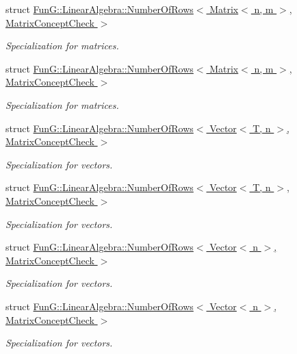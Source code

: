 \begin{DoxyCompactItemize}
struct \hyperlink{structFunG_1_1LinearAlgebra_1_1NumberOfRows_3_01Matrix_3_01n_00_01m_01_4_00_01MatrixConceptCheck_01_4}{Fun\+G\+::\+Linear\+Algebra\+::\+Number\+Of\+Rows$<$ Matrix$<$ n, m $>$, Matrix\+Concept\+Check $>$}
\begin{DoxyCompactList}\small\item\em Specialization for matrices. \end{DoxyCompactList}\item 
struct \hyperlink{structFunG_1_1LinearAlgebra_1_1NumberOfRows_3_01Matrix_3_01n_00_01m_01_4_00_01MatrixConceptCheck_01_4}{Fun\+G\+::\+Linear\+Algebra\+::\+Number\+Of\+Rows$<$ Matrix$<$ n, m $>$, Matrix\+Concept\+Check $>$}
\begin{DoxyCompactList}\small\item\em Specialization for matrices. \end{DoxyCompactList}\item 
struct \hyperlink{structFunG_1_1LinearAlgebra_1_1NumberOfRows_3_01Vector_3_01T_00_01n_01_4_00_01MatrixConceptCheck_01_4}{Fun\+G\+::\+Linear\+Algebra\+::\+Number\+Of\+Rows$<$ Vector$<$ T, n $>$, Matrix\+Concept\+Check $>$}
\begin{DoxyCompactList}\small\item\em Specialization for vectors. \end{DoxyCompactList}\item 
struct \hyperlink{structFunG_1_1LinearAlgebra_1_1NumberOfRows_3_01Vector_3_01T_00_01n_01_4_00_01MatrixConceptCheck_01_4}{Fun\+G\+::\+Linear\+Algebra\+::\+Number\+Of\+Rows$<$ Vector$<$ T, n $>$, Matrix\+Concept\+Check $>$}
\begin{DoxyCompactList}\small\item\em Specialization for vectors. \end{DoxyCompactList}\item 
struct \hyperlink{structFunG_1_1LinearAlgebra_1_1NumberOfRows_3_01Vector_3_01n_01_4_00_01MatrixConceptCheck_01_4}{Fun\+G\+::\+Linear\+Algebra\+::\+Number\+Of\+Rows$<$ Vector$<$ n $>$, Matrix\+Concept\+Check $>$}
\begin{DoxyCompactList}\small\item\em Specialization for vectors. \end{DoxyCompactList}\item 
struct \hyperlink{structFunG_1_1LinearAlgebra_1_1NumberOfRows_3_01Vector_3_01n_01_4_00_01MatrixConceptCheck_01_4}{Fun\+G\+::\+Linear\+Algebra\+::\+Number\+Of\+Rows$<$ Vector$<$ n $>$, Matrix\+Concept\+Check $>$}
\begin{DoxyCompactList}\small\item\em Specialization for vectors. \end{DoxyCompactList}\item 

\end{DoxyCompactItemize}
